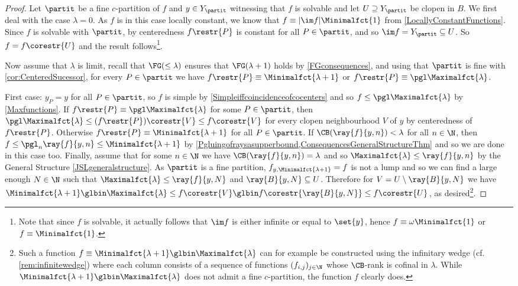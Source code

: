 \begin{proof}
Let $\partit$ be a fine $c$-partition of $f$ and $y\in Y_\partit$ witnessing that $f$ is solvable and let $U\supseteq Y_\partit$ be clopen in $B$.
We first deal with the case $\lambda=0$.
As $f$ is in this case locally constant, we know that $f\equiv |\im f| \Minimalfct{1}$ from \cref{LocallyConstantFunctions}.
Since $f$ is solvable with $\partit$, by centeredness $f\restr{P}$ is constant for all $P\in \partit$, and so $\im f= Y_\partit\subseteq U$. So $f=f\corestr{U}$
and the result follows\footnote{Note that since $f$ is solvable, it actually follows that $\im f$ is either infinite or equal to $\set{y}$,
hence $f\equiv \omega \Minimalfct{1}$ or $f\equiv \Minimalfct{1}$.}.

Now assume that $\lambda$ is limit, recall that $\FG(\leq \lambda)$ ensures that $\FG(\lambda+1)$ holds by \cref{FGconsequences}, and using 
that $\partit$ is fine with \cref{cor:CenteredSucessor},
for every $P\in\partit$ we have $f\restr{P}\equiv \Minimalfct{\lambda+1}$ or $f\restr{P}\equiv  \pgl\Maximalfct{\lambda}$. 

\smallskip

First case:  $y_P=y$ for all $P\in \partit$, so $f$ is simple by \cref{Simpleiffcoincidenceofcocenters} and so $f\leq \pgl \Maximalfct{\lambda}$ by \cref{Maxfunctions}.
If $f\restr{P}\equiv  \pgl\Maximalfct{\lambda}$ for some $P\in \partit$, then $\pgl \Maximalfct{\lambda}\leq (f\restr{P})\corestr{V}\leq f\corestr{V}$ for every clopen neighbourhood $V$ of $y$ by centeredness of $f\restr{P}$. Otherwise $f\restr{P}\equiv\Minimalfct{\lambda+1}$ for all $P\in \partit$. If $\CB(\ray{f}{y,n})<\lambda$ for all $n\in \N$, then $f\leq \pgl_n \ray{f}{y,n}\leq \Minimalfct{\lambda+1}$ by \cref{Pgluingofraysasupperbound,ConsequencesGeneralStructureThm} and so we are done in this case too. Finally, assume that for some $n\in \N$ we have $\CB(\ray{f}{y,n})=\lambda$ and so $\Maximalfct{\lambda}\leq \ray{f}{y,n}$ by the General Structure \cref{JSLgeneralstructure}. As $\partit$ is a fine partition, $f_{y,\Minimalfct{\lambda+1}}=f$ is not a lump and so we can find a large enough $N\in \N$ such that $\Maximalfct{\lambda}\leq  \ray{f}{y,N}$ and $\ray{B}{y, N}\subseteq U$. Therefore for $V=U \setminus \ray{B}{y,N}$ we have  $\Minimalfct{\lambda+1}\glbin\Maximalfct{\lambda}\leq f\corestr{V} \glbin f\corestr{\ray{B}{y,N}}\leq f\corestr {U}$, as desired\footnote{Such a function $f\equiv \Minimalfct{\lambda+1}\glbin\Maximalfct{\lambda}$ can for example be constructed using the infinitary wedge (cf. \cref{rem:infinitewedge}) where each column consists of a sequence of functions $(f_{i,j})_{j\in\N}$ whose $\CB$-rank is cofinal in $\lambda$. While $\Minimalfct{\lambda+1}\glbin\Maximalfct{\lambda}$ does not admit a fine $c$-partition, the function $f$ clearly does.}.


\end{proof}
